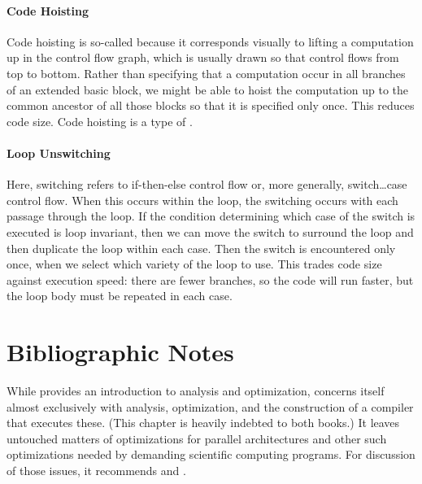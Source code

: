 \paragraph{Code Hoisting}
Code hoisting is so-called because it corresponds visually to lifting a computation up in the control flow graph, which is usually drawn so that control flows from top to bottom. Rather than specifying that a computation occur in all branches of an extended basic block, we might be able to hoist the computation up to the common ancestor of all those blocks so that it is specified only once. This reduces code size. Code hoisting is a type of .


\paragraph{Loop Unswitching}
Here, switching refers to if-then-else control flow or, more generally, switch\dots{}case control flow. When this occurs within the loop, the switching occurs with each passage through the loop. If the condition determining which case of the switch is executed is loop invariant, then we can move the switch to surround the loop and then duplicate the loop within each case. Then the switch is encountered only once, when we select which variety of the loop to use. This trades code size against execution speed: there are fewer branches, so the code will run faster, but the loop body must be repeated in each case.

\section{Bibliographic Notes}
While \citet[chapters~8--10]{Cooper:Engineering:2004} provides an introduction to analysis and optimization, \citet{Muchnick:Advanced:1997} concerns itself almost exclusively with analysis, optimization, and the construction of a compiler that executes these. (This chapter is heavily indebted to both books.) It leaves untouched matters of optimizations for parallel architectures and other such optimizations needed by demanding scientific computing programs. For discussion of those issues, it recommends \citet{Bannerjee:Dependence:1988,Bannerjee:Loop:1993,Bannerjee:Loop:1994,Wolfe:High-Performance:1996} and \citet{Zima:Supercompilers:1991}.

